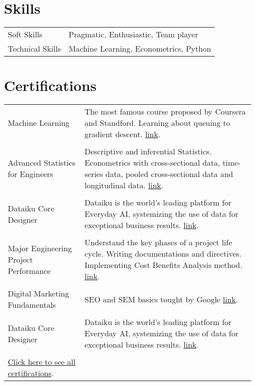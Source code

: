 \documentclass[a4paper,12pt]{article}
\begin{document}
\section{Skills}
\begin{tabularx}{\linewidth}{@{}l X@{}}
Soft Skills &  \normalsize{Pragmatic, Enthusiastic, Team player}\\
Technical Skills  &  \normalsize{ Machine Learning, Econometrics, Python}\\  
\end{tabularx}


\section{Certifications}
\begin{tabularx}{\linewidth}{@{}l X@{}}
Machine Learning &  \normalsize{The most famous course proposed by Coursera and Standford. Learning about queuing to gradient descent.}
\href{shorturl.at/hyzKV}{link}.\\
\\

Advanced Statistics for Engineers &  \normalsize{ Descriptive and inferential Statistics. Econometrics with cross-sectional data, time-series data, pooled cross-sectional data and longitudinal data.}
\href{https://github.com/Sitraka17/CV_LaTeX}{link}.\\
\\

Dataiku Core Designer &  \normalsize{Dataiku is the world's leading platform for Everyday AI, systemizing the use of data for exceptional business results.}
\href{https://verify.skilljar.com/c/bmbokwj42g8j}{link}.\\
\\

Major Engineering Project Performance &  \normalsize{  Understand the key phases of a project life cycle. Writing documentations and directives. Implementing Cost Benefits Analysis method.}
\href{https://www.coursera.org/account/accomplishments/certificate/JXMFTZMYNFGN}{link}.\\
\\

Digital Marketing Fundamentals &  \normalsize{ SEO and SEM basics tought by Google}
\href{https://www.linkedin.com/in/sitraka-matthieu-
forler/details/certifications/}{link}.\\
\\



Dataiku Core Designer &  \normalsize{ Dataiku is the world's leading platform for Everyday AI, systemizing the use of data for exceptional business results.}
\href{https://verify.skilljar.com/c/bmbokwj42g8j}{link}.\\
\\

\href{https://www.linkedin.com/in/sitraka-matthieu-forler/details/certifications/}{Click here to see all certifications}.\\




\end{tabularx}


\vfill
{}
\end{document}
